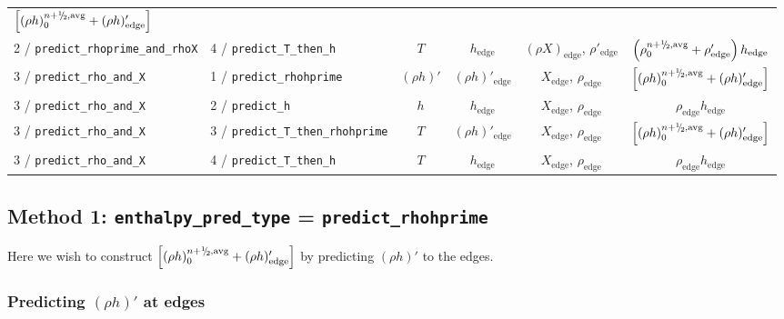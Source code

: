 \begin{landscape}
\begin{table}[t]
{\begin{tabular}{l|l|c|c|c|c}
  $\left [ (\rho h)_0^{n+\myhalf,{\rm avg}} + (\rho h)'_\mathrm{edge} \right ]$ \\
2 / {\tt predict\_rhoprime\_and\_rhoX}  & 4 / {\tt predict\_T\_then\_h} &
  $T$ & $h_\mathrm{edge}$ & 
  $(\rho X)_\mathrm{edge}$, $\rho'_\mathrm{edge}$ & 
  $\left ( \rho_0^{n+\myhalf,{\rm avg}} + \rho'_\mathrm{edge} \right ) h_\mathrm{edge}$ \\
\hline
\hline
3 / {\tt predict\_rho\_and\_X}  & 1 / {\tt predict\_rhohprime} &
  $(\rho h)'$ & $(\rho h)'_\mathrm{edge}$ & 
  $X_\mathrm{edge}$, $\rho_\mathrm{edge}$ & 
  $\left [ (\rho h)_0^{n+\myhalf,{\rm avg}} + (\rho h)'_\mathrm{edge} \right ]$ \\
3 / {\tt predict\_rho\_and\_X}  & 2 / {\tt predict\_h} &
  $h$ & $h_\mathrm{edge}$ & 
  $X_\mathrm{edge}$, $\rho_\mathrm{edge}$ & 
  $\rho_\mathrm{edge} h_\mathrm{edge}$ \\
3 / {\tt predict\_rho\_and\_X}  & 3 / {\tt predict\_T\_then\_rhohprime} &
  $T$ & $(\rho h)'_\mathrm{edge}$ & 
  $X_\mathrm{edge}$, $\rho_\mathrm{edge}$ & 
  $\left [ (\rho h)_0^{n+\myhalf,{\rm avg}} + (\rho h)'_\mathrm{edge} \right ]$ \\
3 / {\tt predict\_rho\_and\_X}  & 4 / {\tt predict\_T\_then\_h} &
  $T$ & $h_\mathrm{edge}$ & 
  $X_\mathrm{edge}$, $\rho_\mathrm{edge}$ & 
  $\rho_\mathrm{edge} h_\mathrm{edge}$ \\
\hline
\end{tabular}
} %
\end{table}
\end{landscape}


\subsection{Method 1: {\tt enthalpy\_pred\_type} = {\tt predict\_rhohprime}}

Here we wish to construct $\left [ (\rho h)_0^{n+\myhalf,{\rm avg}} + (\rho
  h)'_\mathrm{edge} \right ]$ by predicting $(\rho h)'$ to the edges.

\subsubsection{Predicting $(\rho h)'$ at edges}\label{Predicting rhohprime at edges}

